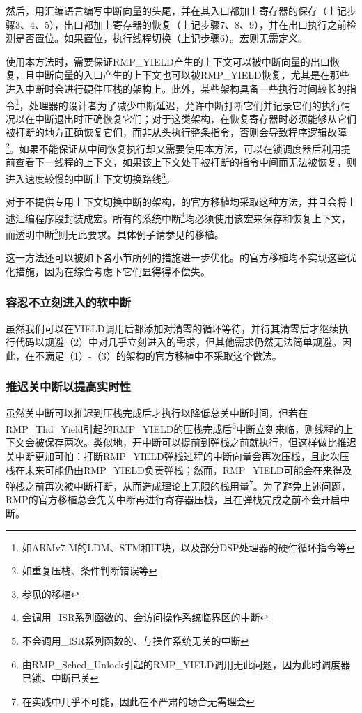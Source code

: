 然后，用汇编语言编写中断向量的头尾，并在其入口都加上寄存器的保存（上记步骤3、4、5），出口都加上寄存器的恢复（上记步骤7、8、9），并在出口执行之前检测是否置位。如果置位，执行线程切换（上记步骤6）。宏则无需定义。

使用本方法时，需要保证RMP\_YIELD产生的上下文可以被中断向量的出口恢复，且中断向量的入口产生的上下文也可以被RMP\_YIELD恢复，尤其是在那些进入中断时会进行硬件压栈的架构上。此外，某些架构具备一些执行时间较长的指令\footnote{如ARMv7-M的LDM、STM和IT块，以及部分DSP处理器的硬件循环指令等}，处理器的设计者为了减少中断延迟，允许中断打断它们并记录它们的执行情况以在中断退出时正确恢复它们；对于这类架构，在恢复寄存器时必须能够从它们被打断的地方正确恢复它们，而非从头执行整条指令，否则会导致程序逻辑故障\footnote{如重复压栈、条件判断错误等}。如果不能保证从中间恢复执行却又需要使用本方法，可以在锁调度器后利用提前查看下一线程的上下文，如果该上下文处于被打断的指令中间而无法被恢复，则进入速度较慢的中断上下文切换路线\footnote{参见的移植}。

对于不提供专用上下文切换中断的架构，的官方移植均采取这种方法，并且会将上述汇编程序段封装成宏。所有的系统中断\footnote{会调用\_ISR系列函数的、会访问操作系统临界区的中断}均必须使用该宏来保存和恢复上下文，而透明中断\footnote{不会调用\_ISR系列函数的、与操作系统无关的中断}则无此要求。具体例子请参见的移植。

这一方法还可以被如下各小节所列的措施进一步优化。的官方移植均不实现这些优化措施，因为在综合考虑下它们显得得不偿失。

\subsubsection{容忍不立刻进入的软中断}\label{subsubsec:tolerating-a-software-interrupt-that-does-not-enter-immediately}

虽然我们可以在YIELD调用后都添加对清零的循环等待，并待其清零后才继续执行代码以规避（2）中对几乎立刻进入的需求，但其他需求仍然无法简单规避。因此，在不满足（1）-（3）的架构的官方移植中不采取这个做法。

\subsubsection{推迟关中断以提高实时性}\label{subsubsec:deferring-interrupt-disabling-to-improve-real-time-behaviour}

\protect{}\label{subsubsec:deferring-interrupt-disabling-to-improve-real-time-behaviour-2}虽然关中断可以推迟到压栈完成后才执行以降低总关中断时间，但若在RMP\_Thd\_Yield引起的RMP\_YIELD的压栈完成后\footnote{由RMP\_Sched\_Unlock引起的RMP\_YIELD调用无此问题，因为此时调度器已锁、中断已关}中断立刻来临，则线程的上下文会被保存两次。类似地，开中断可以提前到弹栈之前就执行，但这样做比推迟关中断更加可怕：打断RMP\_YIELD弹栈过程的中断向量会再次压栈，且此次压栈在未来可能仍由RMP\_YIELD负责弹栈；然而，RMP\_YIELD可能会在来得及弹栈之前再次被中断打断，从而造成理论上无限的栈用量\footnote{在实践中几乎不可能，因此在不严肃的场合无需理会}。为了避免上述问题，RMP的官方移植总会先关中断再进行寄存器压栈，且在弹栈完成之前不会开启中断。

